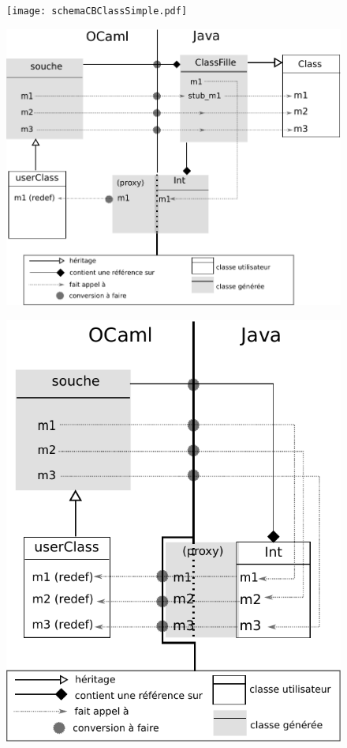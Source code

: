 \documentclass[a4paper, 11pt]{report}
\begin{document}
\begin{figure}[h]
  \centering
  \texttt{[image: schemaCBClassSimple.pdf]}
\end{figure}

\begin{figure}[h]
  \centering
  \includegraphics[scale=0.9]{schemaCBClass.pdf}
\end{figure}
 
\newpage
\begin{figure}[h]
  \centering
  \includegraphics[scale=0.9]{schemaCBInt.pdf}
\end{figure}
\end{document}
